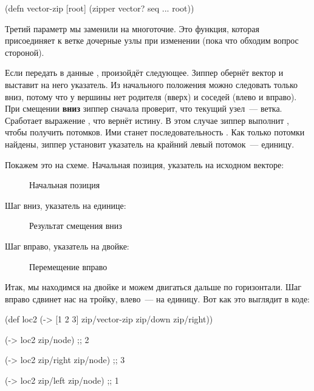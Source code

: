 \begin{english}
  \begin{clojure}
(defn vector-zip
  [root]
  (zipper vector?
          seq
          ...
          root))
  \end{clojure}
\end{english}

Третий параметр мы заменили на многоточие. Это функция, которая присоединяет к
ветке дочерные узлы при изменении (пока что обходим вопрос стороной).

Если передать в  данные \code{[1 2 3]}, произойдёт
следующее. Зиппер обернёт вектор и выставит на него указатель. Из начального
положения можно следовать только вниз, потому что у вершины нет родителя (вверх)
и соседей (влево и вправо). При смещении \textbf{вниз} зиппер сначала проверит,
что текущий узел~--- ветка. Сработает выражение , что
вернёт истину. В этом случае зиппер выполнит , чтобы
получить потомков. Ими станет последовательность . Как только
потомки найдены, зиппер установит указатель на крайний левый потомок~---
единицу.

Покажем это на схеме. Начальная позиция, указатель на исходном векторе:

\begin{figure}[ht!]
  \centering
  \caption{Начальная позиция}
  \label{fig:chart-zip-01}
\end{figure}

Шаг вниз, указатель на единице:

\begin{figure}[ht!]
  \centering
  \caption{Результат смещения вниз}
  \label{fig:chart-zip-02}
\end{figure}

Шаг вправо, указатель на двойке:

\begin{figure}[ht!]
  \centering
  \caption{Перемещение вправо}
  \label{fig:chart-zip-03}
\end{figure}

Итак, мы находимся на двойке и можем двигаться дальше по горизонтали. Шаг вправо
сдвинет нас на тройку, влево~--- на единицу. Вот как это выглядит в коде:

\begin{english}
  \begin{clojure}
(def loc2
  (-> [1 2 3]
      zip/vector-zip
      zip/down
      zip/right))

(-> loc2 zip/node)
;; 2

(-> loc2 zip/right zip/node)
;; 3

(-> loc2 zip/left zip/node)
;; 1
  \end{clojure}
\end{english}

